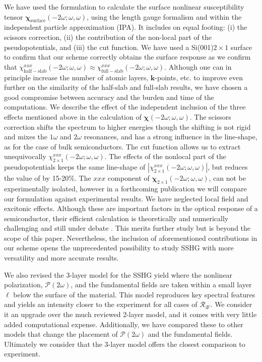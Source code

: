 We have used the formulation to calculate the surface nonlinear susceptibility
tensor $\boldsymbol{\chi}_{\mathrm{surface}}(-2\omega;\omega,\omega)$, using the
length gauge formalism and within the independent particle approximation (IPA).
It includes on equal footing: (i) the scissors correction, (ii) the contribution
of the non-local part of the pseudopotentials, and (iii) the cut function. We
have used a Si(001)$2\times 1$ surface to confirm that our scheme correctly
obtains the surface response as we confirm that
$\chi_{\mathrm{half-slab}}^{xxx}(-2\omega;\omega,\omega) \approx
\chi_{\mathrm{full-slab}}^{xxx}(-2\omega;\omega,\omega)$. Although one can in
principle increase the number of atomic layers, $\mathbf{k}$-points, etc. to
improve even further on the similarity of the half-slab and full-slab results,
we have chosen a good compromise between accuracy and the burden and time of the
computations. We describe the effect of the independent inclusion of the three
effects mentioned above in the calculation of
$\boldsymbol{\chi}(-2\omega;\omega,\omega)$. The scissors correction shifts the
spectrum to higher energies though the shifting is not rigid and mixes the
$1\omega$ and $2\omega$ resonances, and has a strong influence in the
line-shape, as for the case of bulk
semiconductors.\cite{luppiJCP10,luppiPRB10,leitsmannPRB05} The cut function
allows us to extract unequivocally $\chi^{xxx}_{2\times
1}(-2\omega;\omega,\omega)$. The effects of the nonlocal part of the
pseudopotentials keeps the same line-shape of $|\chi^{xxx}_{2\times
1}(-2\omega;\omega,\omega)|$, but reduces the value of by 15-20\%. The $xxx$
component of $\boldsymbol{\chi}_{2\times 1}(-2\omega;\omega,\omega)$, can not be
experimentally isolated, however in a forthcoming publication we will compare
our formulation against experimental results. We have neglected local field and
excitonic effects. Although these are important factors in the optical response
of a semiconductor, their efficient calculation is theoretically and numerically
challenging and still under debate \cite{beyond}. This merits further study but
is beyond the scope of this paper. Nevertheless, the inclusion of aforementioned
contributions in our scheme opens the unprecedented possibility to study SSHG
with more versatility and more accurate results.

We also revised the 3-layer model for the SSHG yield where the nonlinear
polarization, $\boldsymbol{\mathcal{P}}(2\omega)$, and the fundamental fields
are taken within a small layer $\ell$ below the surface of the material. This
model reproduces key spectral features and yields an intensity closer to the
experiment for all cases of $\mathcal{R}_{\mathrm{iF}}$. We consider it an
upgrade over the much reviewed 2-layer model\cite{mizrahiJOSA88}, and it comes
with very little added computational expense. Additionally, we have compared
these to other models that change the placement of
$\boldsymbol{\mathcal{P}}(2\omega)$ and the fundamental fields. Ultimately we
consider that the 3-layer model offers the closest comparison to experiment.

